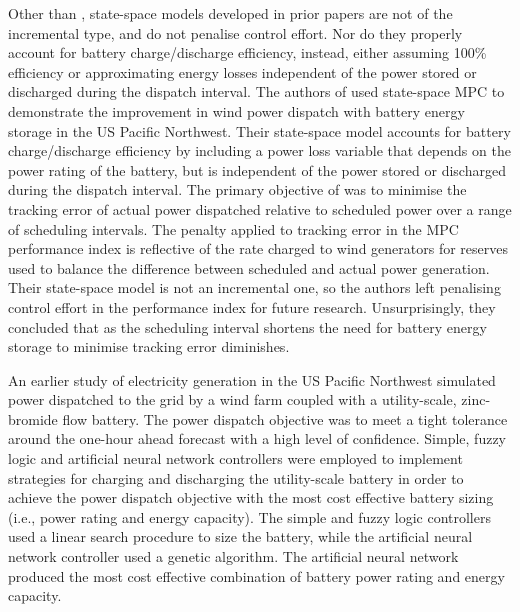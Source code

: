 \documentclass[a4paper, 10pt, twocolumn, preprint, 3p]{elsarticle}
\begin{document}
Other than \cite{TREB16}, state-space models developed in prior papers are not of the incremental type, and do not penalise control effort.  Nor do they properly account for battery charge/discharge efficiency, instead, either assuming 100\% efficiency or approximating energy losses independent of the power stored or discharged during the dispatch interval.  The authors of \cite{HALBB14} used state-space MPC to demonstrate the improvement in wind power dispatch with battery energy storage in the US Pacific Northwest.  Their state-space model accounts for battery charge/discharge efficiency by including a power loss variable that depends on the power rating of the battery, but is independent of the power stored or discharged during the dispatch interval.  The primary objective of \cite{HALBB14} was to minimise the tracking error of actual power dispatched relative to scheduled power over a range of scheduling intervals.  The penalty applied to tracking error in the MPC performance index is reflective of the rate charged to wind generators for reserves used to balance the difference between scheduled and actual power generation.  Their state-space model is not an incremental one, so the authors left penalising control effort in the performance index for future research.  Unsurprisingly, they concluded that as the scheduling interval shortens the need for battery energy storage to minimise tracking error diminishes.

An earlier study \cite{BYJYHH11} of electricity generation in the US Pacific Northwest simulated power dispatched to the grid by a wind farm coupled with a utility-scale, zinc-bromide flow battery.  The power dispatch objective was to meet a tight tolerance around the one-hour ahead forecast with a high level of confidence.  Simple, fuzzy logic and artificial neural network controllers were employed to implement strategies for charging and discharging the utility-scale battery in order to achieve the power dispatch objective with the most cost effective battery sizing (i.e., power rating and energy capacity).  The simple and fuzzy logic controllers used a linear search procedure to size the battery, while the artificial neural network controller used a genetic algorithm.  The artificial neural network produced the most cost effective combination of battery power rating and energy capacity.
\end{document}
